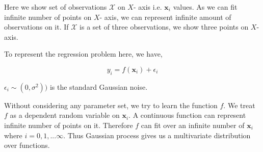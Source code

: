 \documentclass[english]{tktltiki}
\begin{document}
Here we show set of observations $\mathcal{X}$ on $X$- axis i.e. $\mathbf{x}_i$ values. As we can fit infinite number of points on $X$- axis, we can represent infinite amount of observations on it. If $\mathcal{X}$ is a set of three observations, we show three points on $X$-axis.

To represent the regression problem here, we have,

\begin{equation}
y_i = f(\mathbf{x}_i) + \epsilon_i
\label{reg_sym_noise}
\end{equation}

$\epsilon_i \sim (0, \sigma^2))$ is the standard Gaussian noise.

Without considering any parameter set, we try to learn the function $f$. We treat $f$ as a dependent random variable on $\mathbf{x}_i$. A continuous function can represent infinite number of points on it. Therefore $f$ can fit over an infinite number of $\mathbf{x}_i$ where $i = 0, 1, ... \infty$. Thus Gaussian process gives us a multivariate distribution over functions.
\end{document}
